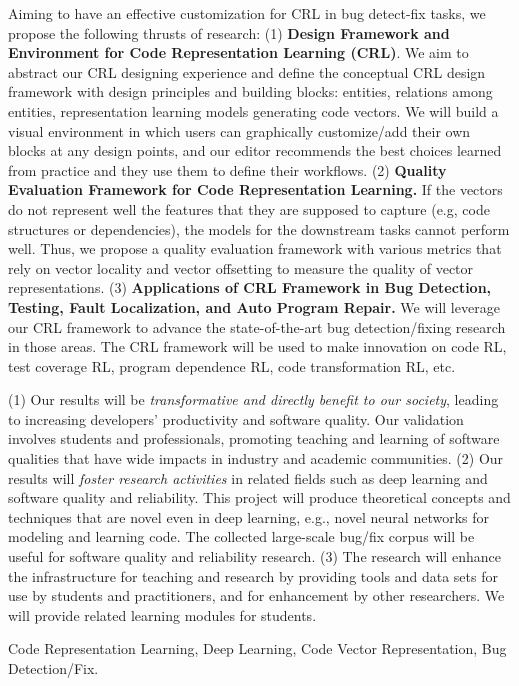 \documentclass[11pt]{article}
\begin{document}
  Aiming to have an effective
customization for CRL in bug detect-fix tasks, we propose the
following thrusts of research: (1) {\bf Design Framework and
  Environment for Code Representation Learning (CRL)}. We aim to
abstract our CRL designing experience and define the conceptual CRL
design framework with design principles and building blocks: entities,
relations among entities, representation learning models generating
code vectors. We will build a visual environment in which users can
graphically customize/add their own blocks at any design points, and
our editor recommends the best choices learned from practice and they
use them to define their workflows.
(2) {\bf Quality Evaluation Framework for Code Representation
  Learning.} If the vectors do not represent well the features that
they are supposed to capture (e.g, code structures or dependencies),
the models for the downstream tasks cannot perform well. Thus, we
propose a quality evaluation framework with various metrics that rely
on vector locality and vector offsetting to measure the quality of
vector representations. (3) {\bf Applications of CRL Framework in Bug
  Detection, Testing, Fault Localization, and Auto Program Repair.}
We will leverage our CRL framework to advance the state-of-the-art bug
detection/fixing research in those areas. The CRL framework
will be used to make innovation on code RL, test coverage RL, program
dependence RL, code transformation RL, etc.

  (1) Our results will be {\em
  transformative and directly benefit to our society}, leading to
increasing developers’ productivity and software quality. Our
validation involves students and professionals, promoting teaching and
learning of software qualities that have wide impacts in industry and
academic communities. (2) Our results will {\em foster research
  activities} in related fields such as deep learning and software
quality and reliability. This project will produce theoretical
concepts and techniques that are novel even in deep learning, e.g.,
novel neural networks for modeling and learning code. The collected
large-scale bug/fix corpus will be useful for software quality and
reliability research.
(3) The research will enhance the infrastructure for teaching and
research by providing tools and data sets for use by students and
practitioners, and for enhancement by other researchers. We will
provide related learning modules for students.

 Code Representation Learning, Deep Learning, Code Vector Representation, Bug Detection/Fix.
\end{document}
